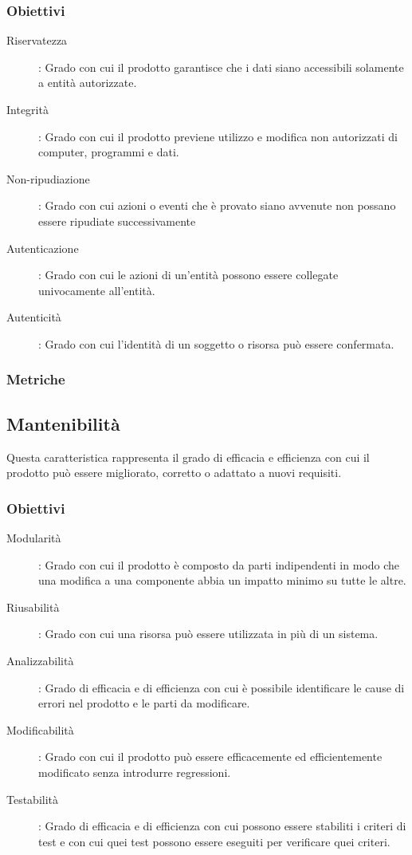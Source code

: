 \documentclass[../piano-di-qualifica.tex]{subfiles}
\begin{document}
  \subsubsection{Obiettivi}%
  \label{subs:obiettivi}
      \begin{description}
        \item [Riservatezza]: Grado con cui il prodotto garantisce che i dati siano accessibili solamente a entità autorizzate.
        \item [Integrità]: Grado con cui il prodotto previene utilizzo e modifica non autorizzati di computer, programmi e dati.
        \item [Non-ripudiazione]: Grado con cui azioni o eventi che è provato siano avvenute non possano essere ripudiate successivamente
        \item [Autenticazione]: Grado con cui le azioni di un'entità possono essere collegate univocamente all'entità.
        \item [Autenticità]: Grado con cui l'identità di un soggetto o risorsa può essere confermata.
      \end{description}

  \subsubsection{Metriche}%
  \label{subs:metriche}



\subsection{Mantenibilità}%
\label{sub:mantenibilita}
Questa caratteristica rappresenta il grado di efficacia e efficienza con cui il prodotto può essere migliorato, corretto o adattato a nuovi requisiti.

\subsubsection{Obiettivi}%
\label{subs:obiettivi}
      \begin{description}
        \item [Modularità]: Grado con cui il prodotto è composto da parti indipendenti in modo che una modifica a una componente abbia un impatto minimo su tutte le altre.
        \item [Riusabilità]: Grado con cui una risorsa può essere utilizzata in più di un sistema.
        \item [Analizzabilità]: Grado di efficacia e di efficienza con cui è possibile identificare le cause di errori nel prodotto e le parti da modificare.
        \item [Modificabilità]: Grado con cui il prodotto può essere efficacemente ed efficientemente modificato senza introdurre regressioni.
        \item [Testabilità]: Grado di efficacia e di efficienza con cui possono essere stabiliti i criteri di test e con cui quei test possono essere eseguiti per verificare quei criteri.
      \end{description}
\end{document}

